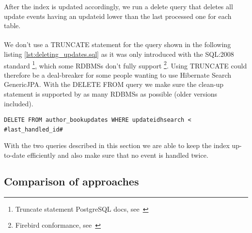 \pagebreak
\noindent
After the index is updated accordingly, we run a delete query that deletes all update events
having an updateid lower than the last processed one for each table.
\\\\
We don't use a TRUNCATE statement for the query shown in the following listing \ref{lst:deleting_updates.sql} as it was only introduced with the SQL:2008 standard \footnote{Truncate statement PostgreSQL docs, see~\cite{postgres_truncate}}, which some RDBMSs don't fully support \footnote{Firebird conformance, see~\cite{firebird_conformance}}. Using TRUNCATE could therefore be a deal-breaker for some people wanting to use Hibernate Search GenericJPA. With the DELETE FROM query we make sure the clean-up statement is supported by as many RDBMSs as possible (older versions included).
\\
\lstset{language=sql}
\begin{lstlisting}[frame=htrbl, caption={Deleting handled updates (Author\_Book)},
label={lst:deleting_updates.sql}]
DELETE FROM author_bookupdates WHERE updateidhsearch < #last_handled_id#
\end{lstlisting}
\noindent
With the two queries described in this section we are able to keep the index up-to-date efficiently and also make sure that no event is handled twice.

\pagebreak

\subsection{Comparison of approaches}


